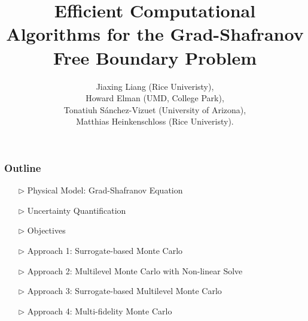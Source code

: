 \documentclass{beamer}
\title[Grad-Shafranov]{\Large  
Efficient Computational Algorithms for the Grad-Shafranov Free Boundary Problem}
\author[Jiaxing Liang]{\normalsize Jiaxing Liang (Rice Univeristy),\\
\vspace{4mm}
Howard Elman (UMD, College Park),\\
Tonatiuh S\'anchez-Vizuet (University of Arizona),\\
Matthias Heinkenschloss (Rice Univeristy).}
\begin{document}
\frame{\titlepage }

\begin{frame}[c]		
\frametitle{Outline}
\normalsize
\begin{itemize}[leftmargin=5pt] 
\item[$\triangleright$] Physical Model: Grad-Shafranov Equation
\vspace{0.3cm}
\item[$\triangleright$] Uncertainty Quantification 
\vspace{0.3cm}
\item[$\triangleright$] Objectives
\vspace{0.3cm}
\item[$\triangleright$] Approach 1: Surrogate-based Monte Carlo
\item[$\triangleright$] Approach 2: Multilevel Monte Carlo with Non-linear Solve
\item[$\triangleright$] Approach 3: Surrogate-based Multilevel Monte Carlo
\item[$\triangleright$] Approach 4: Multi-fidelity Monte Carlo
\end{itemize}
\end{frame}
\end{document}
